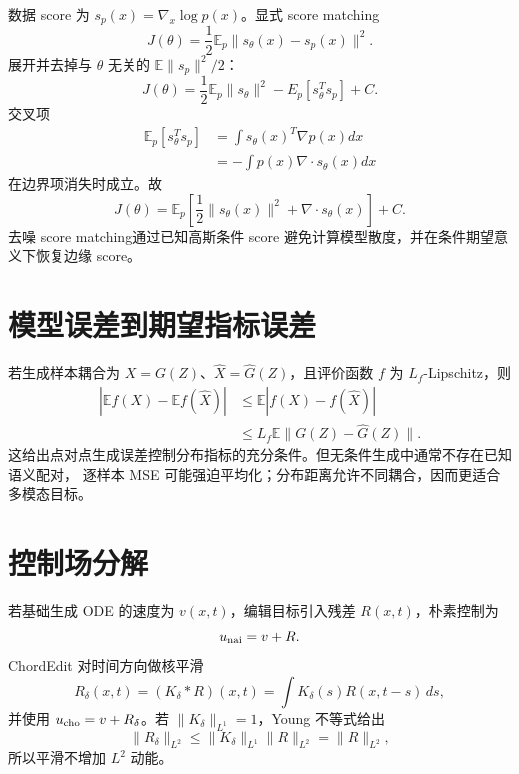 \documentclass[11pt]{article}
\numberwithin{equation}{section}
\newcommand{\E}{\mathbb{E}}
\newcommand{\1}{\mathbf{1}}
\begin{document}
数据 score 为 $s_p(x)=\nabla_x\log p(x)$。显式 score matching
\begin{equation}
 J(\theta)=\frac12\E_p\|s_\theta(x)-s_p(x)\|^2.
\end{equation}
展开并去掉与 $\theta$ 无关的 $\E\|s_p\|^2/2$：
\begin{equation}
 J(\theta)=\frac12\E_p\|s_\theta\|^2-E_p[s_\theta^Ts_p]+C.
\end{equation}
交叉项
\begin{align}
 \E_p[s_\theta^Ts_p]
 &=\int s_\theta(x)^T\nabla p(x)dx\\
 &=-\int p(x)\nabla\cdot s_\theta(x)dx
\end{align}
在边界项消失时成立。故
\begin{equation}
 J(\theta)=\E_p\left[
 \frac12\|s_\theta(x)\|^2+\nabla\cdot s_\theta(x)
 \right]+C.
\end{equation}
去噪 score matching通过已知高斯条件 score 避免计算模型散度，并在条件期望意义下恢复边缘 score。

\section{模型误差到期望指标误差}

若生成样本耦合为 $X=G(Z)$、$\widehat X=\widehat G(Z)$，且评价函数
$f$ 为 $L_f$-Lipschitz，则
\begin{align}
 |\E f(X)-\E f(\widehat X)|
 &\le\E|f(X)-f(\widehat X)|\\
 &\le L_f\E\|G(Z)-\widehat G(Z)\|.
\end{align}
这给出点对点生成误差控制分布指标的充分条件。但无条件生成中通常不存在已知语义配对，
逐样本 MSE 可能强迫平均化；分布距离允许不同耦合，因而更适合多模态目标。

\section{控制场分解}
若基础生成 ODE 的速度为 $v(x,t)$，编辑目标引入残差 $R(x,t)$，朴素控制为
\begin{equation}
  u_{\rm nai}=v+R.
\end{equation}
ChordEdit 对时间方向做核平滑
\begin{equation}
  R_\delta(x,t)=(K_\delta*R)(x,t)
  =\int K_\delta(s)R(x,t-s)\,ds,
\end{equation}
并使用 $u_{\rm cho}=v+R_\delta$。若 $\|K_\delta\|_{L^1}=1$，Young 不等式给出
\begin{equation}
  \|R_\delta\|_{L^2}\le\|K_\delta\|_{L^1}\|R\|_{L^2}=\|R\|_{L^2},
\end{equation}
所以平滑不增加 $L^2$ 动能。
\end{document}
